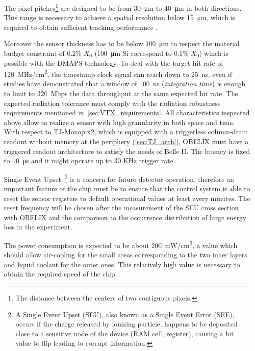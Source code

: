 The pixel pitches\footnote{The distance between the centers of two contiguous pixels.} are designed to be from \SI{30}{\micro m} to \SI{40}{\micro m} in both directions. This range is necessary to achieve a spatial resolution below \SI{15}{\micro m}, which is required to obtain sufficient tracking performance \cite{F.Forti:3930}.


Moreover the sensor thickness has to be below \SI{100}{\micro m} to respect the material budget constraint of 0.2\% $X_{0}$ (\SI{100}{\micro m} Si correspond to 0.1\% $X_{0}$) which is possible with the DMAPS technology. 
To deal with the target hit rate of \SI{120}{MHz/cm^{2}}, the timestamp clock signal can reach down to \SI{25}{ns}, even if studies have demonstrated that a window of \SI{100}{ns} (\textit{integration time}) is enough to limit to \SI{320}{Mbps} the data throughput at the same expected hit rate. The expected radiation tolerance must comply with the radiation robustness requirements mentioned in~\autoref{sec:VTX_requirements}.
All characteristics inspected above allow to realize a sensor with high granularity in both space and time.\\

With respect to TJ-Monopix2, which is equipped with a triggerless column-drain readout without memory at the periphery (\autoref{sec:TJ_arch}), OBELIX must have a triggered readout architecture to satisfy the needs of Belle II. The latency is fixed to \SI{10}{\micro s} and it might operate up to 30 KHz trigger rate.


Single Event Upset~\footnote{A Single Event Upset (SEU), also known as a Single Event Error (SEE), occurs if the charge released by ionizing particle, happens to be deposited close to a sensitive node of the device (RAM cell, register), causing a bit value to flip leading to corrupt information.} is a concern for future detector operation, therefore an important feature of the chip must be to ensure that the control system is able to reset the sensor registers to default operational values at least every minutes. The reset frequency will be chosen after the measurement of the SEU cross section with OBELIX and the comparison to the occurrence distribution of large energy loss in the experiment.

The power consumption is expected to be about \SI{200}{mW/cm^{2}}, a value which should allow air-cooling for the small areas corresponding to the two inner layers and liquid coolant for the outer ones. This relatively high value is necessary to obtain the required speed of the chip.


